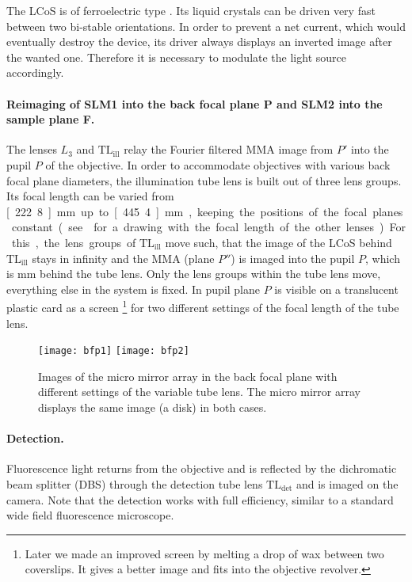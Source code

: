 
The LCoS is of ferroelectric type \citetext{\citealp[see][]{1991Saleh}
  and \citealp[p.~192]{Goodman1996}}.  Its liquid crystals can be
driven very fast between two bi-stable orientations. In order to
prevent a net current, which would eventually destroy the device, its
driver always displays an inverted image after the wanted
one. Therefore it is necessary to modulate the light source
accordingly.


\paragraph{Reimaging of SLM1 into the back focal plane P and SLM2 into
  the sample plane F.}
The lenses $L_3$ and $\textrm{TL}_\textrm{ill}$ relay the Fourier
filtered MMA image from $P'$ into the pupil $P$ of the objective. In
order to accommodate objectives with various back focal plane
diameters, the illumination tube lens is built out of three lens
groups. Its focal length can be varied from \unit[222.8]{mm} up to
\unit[445.4]{mm}, keeping the positions of the focal planes
constant(see  for a drawing with the focal
length of the other lenses). For this, the lens groups of
$\textrm{TL}_\textrm{ill}$ move such, that the image of the LCoS
behind $\textrm{TL}_\textrm{ill}$ stays in infinity and the MMA (plane
$P''$) is imaged into the pupil $P$, which is \unit[250]{mm} behind
the tube lens. Only the lens groups within the tube lens move,
everything else in the system is fixed. In 
pupil plane $P$ is visible on a translucent plastic card as a screen
\footnote{Later we made an improved screen by melting a drop of wax
  between two coverslips. It gives a better image and fits into the
  objective revolver.} for two different settings of the focal length
of the tube lens.

\begin{figure}[!htbp]
  \centering
  \texttt{[image: bfp1]}
  \texttt{[image: bfp2]}
  \caption{Images of the micro mirror array in the back focal plane
    with different settings of the variable tube lens. The micro mirror
    array displays the same image (a disk) in both cases.}
  \label{fig:tubelens-bfp}
\end{figure}


\paragraph{Detection.}
Fluorescence light returns from the objective and is reflected by the
dichromatic beam splitter (DBS) through the detection tube lens
$\textrm{TL}_\textrm{det}$ and is imaged on the camera. Note that the
detection works with full efficiency, similar to a standard wide field
fluorescence microscope.


